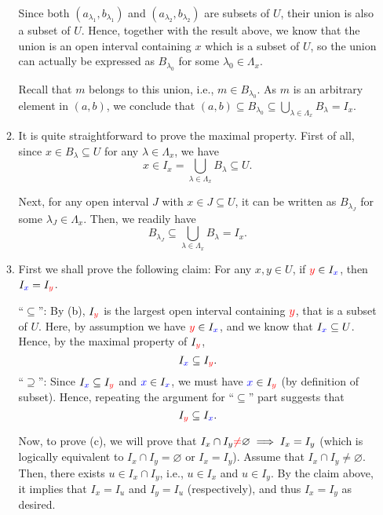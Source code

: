 \begin{enumerate}
\begin{pf}
\begin{enumerate}
Since both \((a_{\lambda_1},b_{\lambda_1})\) and
\((a_{\lambda_2},b_{\lambda_2})\) are subsets of \(U\), their union is also a
subset of \(U\). Hence, together with the result above, we know that the union
is an open interval containing \(x\) which is a subset of \(U\), so the union
can actually be expressed as \(B_{\lambda_0}\) for some
\(\lambda_0\in\Lambda_x\).

Recall that \(m\) belongs to this union, i.e., \(m\in B_{\lambda_0}\).
As \(m\) is an arbitrary element in \((a,b)\), we conclude that \(
(a,b)\subseteq B_{\lambda_0}\subseteq
\bigcup_{\lambda\in\Lambda_x}B_{\lambda}=I_x\).

\item It is quite straightforward to prove the maximal property. First of all,
since \(x\in B_{\lambda}\subseteq U\) for any \(\lambda\in\Lambda_{x}\), we have
\[
x\in I_x=\bigcup_{\lambda\in\Lambda_{x}}B_{\lambda}\subseteq U.
\]

Next, for any open interval \(J\) with \(x\in J\subseteq U\), it can be written
as \(B_{\lambda_J}\) for some \(\lambda_J\in\Lambda_x\). Then, we readily have
\[
B_{\lambda_{J}}\subseteq \bigcup_{\lambda\in\Lambda_x}B_{\lambda}=I_x.
\]

\item First we shall prove the following claim: For any \(x,y\in U\), if
\({\color{red}y}\in I_{\color{blue}x}\), then \(I_{\color{blue}x}=I_{{\color{red}y}}\).

\begin{pf}
``\(\subseteq\)'': By (b), \(I_{\color{red}y}\) is the largest open interval containing
\({\color{red}y}\), that is a subset of \(U\). Here, by assumption we have \({\color{red}y}\in
I_{\color{blue}x}\), and we know that \(I_{\color{blue}x}\subseteq U\). Hence, by the maximal property of
\(I_{\color{red}y}\),
\[
I_{\color{blue}x}\subseteq I_{\color{red}y}.
\]
``\(\supseteq\)'': Since \(I_{\color{blue}x}\subseteq I_{\color{red}y}\) and \({\color{blue}x}\in
I_{\color{blue}x}\), we must have \({\color{blue}x}\in I_{\color{red}y}\) (by definition of subset).
Hence, repeating the argument for ``\(\subseteq\)'' part suggests that
\[I_{\color{red}y}\subseteq I_{\color{blue}x}.\]
\end{pf}

Now, to prove (c), we will prove that \(I_x\cap I_y{\color{red}\ne}\varnothing\implies
I_x=I_y\) (which is logically equivalent to \(I_x\cap I_y=\varnothing\) or
\(I_x=I_y\)). Assume that \(I_x\cap I_y\ne\varnothing\). Then, there exists
\(u\in I_x\cap I_y\), i.e., \(u\in I_x\) and \(u\in I_y\). By the claim above,
it implies that \(I_x=I_u\) and \(I_y=I_u\) (respectively), and thus
\(I_x=I_y\) as desired.
\end{enumerate}
\end{pf}


\end{enumerate}
